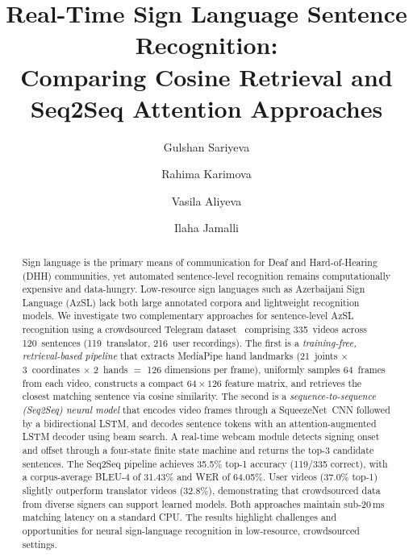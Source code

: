 \documentclass[runningheads]{llncs}
\begin{document}
%
\title{Real-Time Sign Language Sentence Recognition:\\
Comparing Cosine Retrieval and Seq2Seq Attention Approaches}
%
%
\author{Gulshan Sariyeva \and
Rahima Karimova \and
Vasila Aliyeva \and
Ilaha Jamalli}
%
%
%
\maketitle
%
\begin{abstract}
Sign language is the primary means of communication for Deaf and
Hard-of-Hearing (DHH) communities, yet automated sentence-level
recognition remains computationally expensive and data-hungry.
Low-resource sign languages such as Azerbaijani Sign Language (AzSL)
lack both large annotated corpora and lightweight recognition models.
We investigate two complementary approaches for sentence-level AzSL
recognition using a crowdsourced Telegram
dataset~\cite{mustafazada2025crowdsourcing} comprising 335~videos
across 120~sentences (119~translator, 216~user recordings).
The first is a \emph{training-free, retrieval-based pipeline} that
extracts MediaPipe hand landmarks (21~joints $\times$ 3~coordinates
$\times$ 2~hands $=$ 126 dimensions per frame), uniformly samples
64~frames from each video, constructs a compact
$64 \times 126$ feature matrix, and retrieves the closest matching
sentence via cosine similarity.
The second is a \emph{sequence-to-sequence (Seq2Seq) neural model}
that encodes video frames through a SqueezeNet~CNN followed by a
bidirectional LSTM, and decodes sentence tokens with an
attention-augmented LSTM decoder using beam search.
A real-time webcam module detects signing onset and offset through a
four-state finite state machine and returns the top-3 candidate
sentences.
The Seq2Seq pipeline achieves 35.5\% top-1 accuracy (119/335
correct), with a corpus-average BLEU-4 of 31.43\% and WER of
64.05\%.
User videos (37.0\% top-1) slightly outperform translator
videos (32.8\%), demonstrating that crowdsourced data from diverse
signers can support learned models.
Both approaches maintain sub-20\,ms matching latency on a
standard CPU.
The results highlight challenges and opportunities for
neural sign-language recognition in low-resource, crowdsourced
settings.

\end{abstract}
%
%
\end{document}
